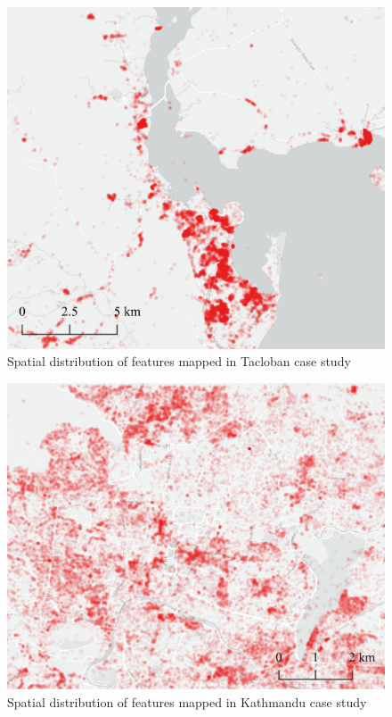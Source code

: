 \begin{figure} %
    \centering %
    \includegraphics[width = \textwidth]{Images/tac_2.png} %
    \caption{Spatial distribution of features mapped in Tacloban case study} %
\end{figure}

\begin{figure} %
    \centering %
    \includegraphics[width = \textwidth]{Images/nep_2.png} %
    \caption{Spatial distribution of features mapped in Kathmandu case study} %
\end{figure}
